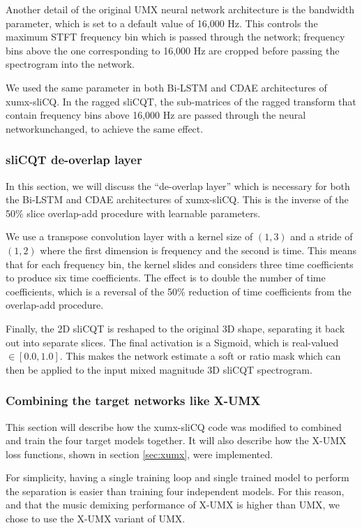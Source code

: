 \documentclass[report.tex]{subfiles}
\begin{document}
Another detail of the original UMX neural network architecture is the bandwidth parameter, which is set to a default value of 16,000 Hz. This controls the maximum STFT frequency bin which is passed through the network; frequency bins above the one corresponding to 16,000 Hz are cropped before passing the spectrogram into the network.

We used the same parameter in both Bi-LSTM and CDAE architectures of xumx-sliCQ. In the ragged sliCQT, the sub-matrices of the ragged transform that contain frequency bins above 16,000 Hz are passed through the neural networkunchanged, to achieve the same effect.

\subsubsection{sliCQT de-overlap layer}
\label{sec:deoverlap}

In this section, we will discuss the ``de-overlap layer'' which is necessary for both the Bi-LSTM and CDAE architectures of xumx-sliCQ. This is the inverse of the 50\% slice overlap-add procedure with learnable parameters.

We use a transpose convolution layer with a kernel size of $(1, 3)$ and a stride of $(1, 2)$ where the first dimension is frequency and the second is time. This means that for each frequency bin, the kernel slides and considers three time coefficients to produce six time coefficients. The effect is to double the number of time coefficients, which is a reversal of the 50\% reduction of time coefficients from the overlap-add procedure.

Finally, the 2D sliCQT is reshaped to the original 3D shape, separating it back out into separate slices. The final activation is a Sigmoid, which is real-valued $\in [0.0, 1.0]$. This makes the network estimate a soft or ratio mask which can then be applied to the input mixed magnitude 3D sliCQT spectrogram.

\subsubsection{Combining the target networks like X-UMX}
\label{sec:xumxinc}

This section will describe how the xumx-sliCQ code was modified to combined and train the four target models together. It will also describe how the X-UMX loss functions, shown in section \ref{sec:xumx}, were implemented.

For simplicity, having a single training loop and single trained model to perform the separation is easier than training four independent models. For this reason, and that the music demixing performance of X-UMX is higher than UMX, we chose to use the X-UMX variant of UMX.
\end{document}
